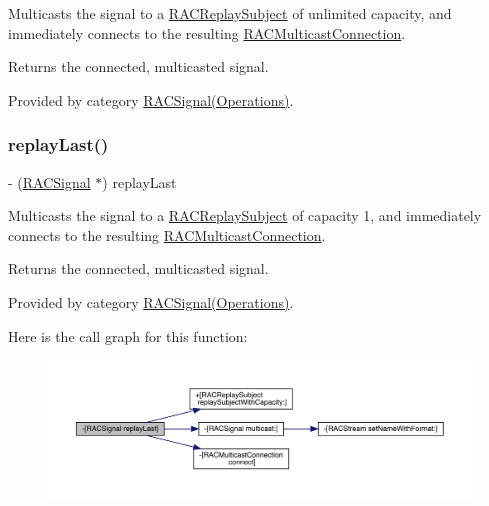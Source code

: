 Multicasts the signal to a \mbox{\hyperlink{interface_r_a_c_replay_subject}{R\+A\+C\+Replay\+Subject}} of unlimited capacity, and immediately connects to the resulting \mbox{\hyperlink{interface_r_a_c_multicast_connection}{R\+A\+C\+Multicast\+Connection}}.

Returns the connected, multicasted signal. 

Provided by category \mbox{\hyperlink{category_r_a_c_signal_07_operations_08_a6d7d83297f6b837dd5efc18c38483a94}{R\+A\+C\+Signal(\+Operations)}}.

\mbox{\label{interface_r_a_c_signal_a1a660e0db48169a1ea54288b196515b1}} 
\subsubsection{\texorpdfstring{replay\+Last()}{replayLast()}\hspace{0.1cm}{\footnotesize\ttfamily [1/3]}}
{\footnotesize\ttfamily -\/ (\mbox{\hyperlink{interface_r_a_c_signal}{R\+A\+C\+Signal}} $\ast$) replay\+Last \begin{DoxyParamCaption}{ }\end{DoxyParamCaption}}

Multicasts the signal to a \mbox{\hyperlink{interface_r_a_c_replay_subject}{R\+A\+C\+Replay\+Subject}} of capacity 1, and immediately connects to the resulting \mbox{\hyperlink{interface_r_a_c_multicast_connection}{R\+A\+C\+Multicast\+Connection}}.

Returns the connected, multicasted signal. 

Provided by category \mbox{\hyperlink{category_r_a_c_signal_07_operations_08_a1a660e0db48169a1ea54288b196515b1}{R\+A\+C\+Signal(\+Operations)}}.

Here is the call graph for this function\+:\nopagebreak
\begin{figure}[H]
\begin{center}
\leavevmode
\includegraphics[width=350pt]{interface_r_a_c_signal_a1a660e0db48169a1ea54288b196515b1_cgraph}
\end{center}
\end{figure}
\mbox{\label{interface_r_a_c_signal_a1a660e0db48169a1ea54288b196515b1}} 
